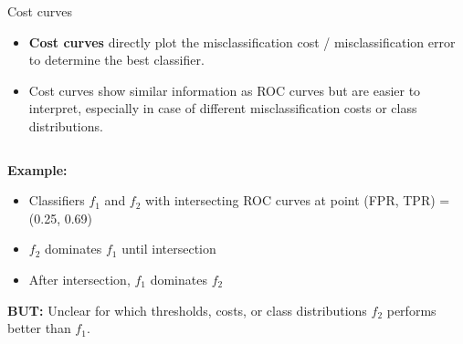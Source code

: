 \begin{vbframe}{Cost curves}

\begin{itemize}
  \item \textbf{Cost curves} directly plot the misclassification cost /
  misclassification error to determine the best classifier.
  \item Cost curves show similar information as ROC curves but are
  easier to interpret, especially in case of different misclassification costs or class
  distributions. %
\end{itemize}



\begin{columns}%
\begin{column}{0.6\textwidth}
  \small
  \raggedright
  \textbf{Example:} %
  \begin{itemize}
  \item Classifiers $f_1$ and $f_2$ with intersecting ROC curves at point (FPR, TPR) = (0.25, 0.69)
  \item $f_2$ dominates $f_1$ until intersection
  \item After intersection, $f_1$ dominates $f_2$
  \end{itemize}

  \textbf{BUT:} Unclear for which thresholds, costs, or class distributions $f_2$ performs better than $f_1$.


\end{column}
\end{columns}
\end{vbframe}
